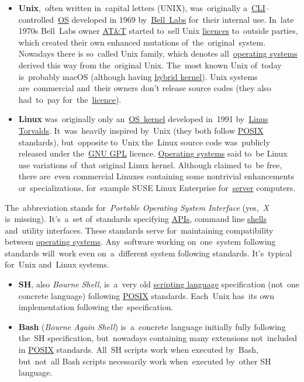 \label{linux}

\label{unixlinux}
\begin{itemize}
    \item \textbf{Unix},~often written in~capital letters (UNIX), was~originally a~\hyperref[shellcligui]{CLI}--controlled~\hyperref[os]{OS} developed in 1969 by~\href{https://en.wikipedia.org/wiki/Bell_Labs}{Bell~Labs} for~their internal use. In~late 1970s Bell~Labs owner \href{https://en.wikipedia.org/wiki/AT\%26T}{AT\&T} started to~sell Unix \hyperref[licencing]{licences} to~outside parties, which created their own enhanced mutations of~the~original~system. Nowadays there is so~called Unix family, which denotes all~\hyperref[os]{operating systems} derived this way from the~original Unix. The~most known Unix of~today is~probably macOS (although having \hyperref[hybridkernel]{hybrid kernel}). \warningnonl Unix systems are~commercial and~their owners don't release source codes (they also had~to~pay for~the~\hyperref[licencing]{licence}).
    \item \textbf{Linux} was~originally only an~\hyperref[kernel]{OS~kernel} developed in~1991 by~\href{https://en.wikipedia.org/wiki/Linus_Torvalds}{Linus Torvalds}. It~was~heavily inspired by~Unix (they both follow \hyperref[posix]{POSIX} standards), but~opposite to~Unix the~Linux source code was~publicly released under the~\hyperref[gpl]{GNU GPL} licence. \hyperref[os]{Operating systems} said to~be Linux use variations of~that original Linux kernel. Although claimed to~be free, there are~even commercial Linuxes containing some nontrivial enhancements or~specializations, for~example SUSE Linux Enterprise for~\hyperref[server]{server} computers.
\end{itemize}

\label{posix}
The~abbreviation stands for~\textit{Portable Operating System Interface} (yes,~\textit{X} is~missing). It's~a~set of~standards specifying \hyperref[api]{APIs}, command line \hyperref[shellcligui]{shells} and~utility interfaces. These standards serve for~maintaining compatibility between \hyperref[os]{operating systems}. Any~software working on~one~system following standards will~work even on~a~different system following standards. It's~typical for~Unix and~Linux systems.
\newpage

\label{shbash}
\begin{itemize}
    \item \textbf{SH}, also \textit{Bourne Shell}, is~a~very old \hyperref[scriptinglanguages]{scripting language} specification (not~one concrete language) following \hyperref[posix]{POSIX} standards. Each~Unix has~its own implementation following the~specification.
    \item \textbf{Bash} (\textit{Bourne Again Shell}) is~a~concrete language initially fully following the~SH specification, but~nowadays containing many extensions not~included in \hyperref[posix]{POSIX} standards. All~SH scripts work when executed by~Bash, but~not~all Bash scripts necessarily work when~executed by~other SH language.
\end{itemize}


